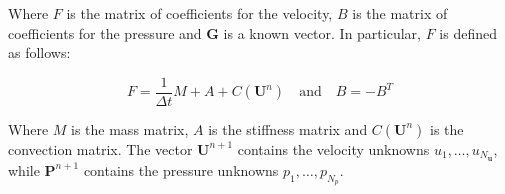 Where $F$ is the matrix of coefficients for the velocity, $B$ is the matrix of coefficients for the pressure and $\mathbf{G}$ is a known vector. In particular, $F$ is defined as follows:

\begin{equation}
    F = \frac{1}{\Delta t} M + A + C(\mathbf{U}^n) \quad \text{and} \quad B = -B^T
\end{equation}

Where $M$ is the mass matrix, $A$ is the stiffness matrix and $C(\mathbf{U}^n)$ is the convection matrix. The vector $\mathbf{U}^{n+1}$ contains the velocity unknowns $u_1, \dots, u_{N_{\mathbf{u}}}$, while $\mathbf{P}^{n+1}$ contains the pressure unknowns $p_1, \dots, p_{N_p}$.